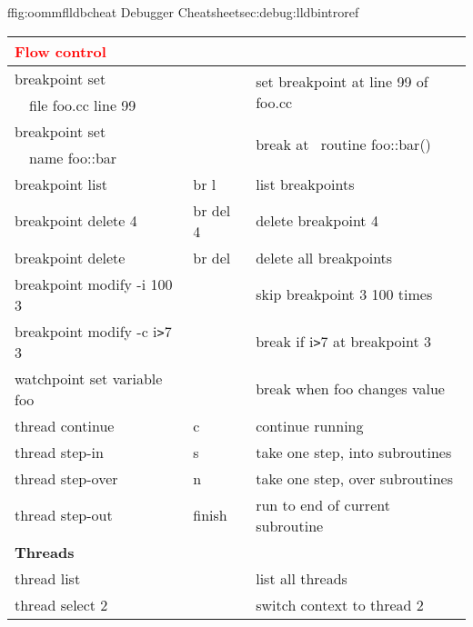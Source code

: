 \begin{codelisting}{f}{fig:oommflldbcheat}{ Debugger
    Cheatsheet\HTMLoutput{\phantom{\rule{1pt}{1.5\baselineskip}}}}{sec:debug:lldbintro}{ref}
\begin{center}
\begin{tabular}{|l|l|l|}
  \multicolumn{3}{|l|}{
    \rule{0pt}{3ex}\textcolor{red}{\textbf{Flow control}}}\\\hline

  breakpoint set && \multirow{2}{*}{set breakpoint at line 99 of foo.cc}\\
  ~~{\dblhyp}file foo.cc {\dblhyp}line 99 && \\

  breakpoint set && \multirow{2}{*}{break at \Cplusplus\ routine foo::bar()}\\
  ~~{\dblhyp}name foo::bar && \\

  breakpoint list & br l & list breakpoints\\
  breakpoint delete 4 & br del 4 & delete breakpoint 4\\
  breakpoint delete & br del & delete all breakpoints\\

  breakpoint modify -i 100 3 & & skip breakpoint 3 100 times\\
  breakpoint modify -c i\verb+>+7 3
   && break if i\verb+>+7 at breakpoint 3\\
  watchpoint set variable foo && break when foo changes value\\[1ex]

  thread continue & c & continue running\\
  thread step-in & s & take one step, into subroutines\\
  thread step-over & n & take one step, over subroutines\\
  thread step-out & finish & run to end of current subroutine\\[1ex]\hline

  \multicolumn{3}{|l|}{
  \rule{0pt}{3ex}\textcolor[rgb]{0.6,0,0.9}{\textbf{Threads}}}\\\hline
  thread list &  & list all threads\\
  thread select 2 & & switch context to thread 2\\\hline
    \end{tabular}
  \end{center}\html{\newline}
\end{codelisting}

